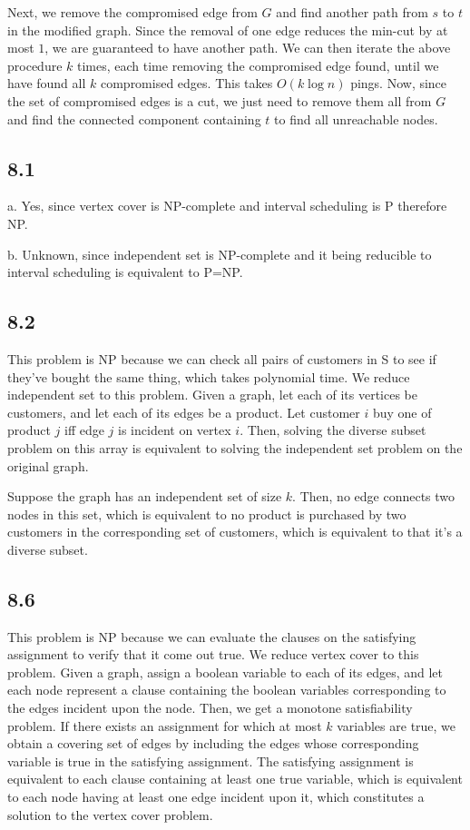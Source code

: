 \documentclass{article}
\begin{document}
Next, we remove the compromised edge from $G$ and find another path from $s$ to $t$ in the modified graph. Since the removal of one edge reduces the min-cut by at most $1$, we are guaranteed to have another path. We can then iterate the above procedure $k$ times, each time removing the compromised edge found, until we have found all $k$ compromised edges. This takes $O(k\log n)$ pings. Now, since the set of compromised edges is a cut, we just need to remove them all from $G$ and find the connected component containing $t$ to find all unreachable nodes.
\subsection*{8.1}
a. Yes, since vertex cover is NP-complete and interval scheduling is P therefore NP.

\noindent b. Unknown, since independent set is NP-complete and it being reducible to interval scheduling is equivalent to P=NP.
\subsection*{8.2}
This problem is NP because we can check all pairs of customers in S to see if they've bought the same thing, which takes polynomial time. We reduce independent set to this problem. Given a graph, let each of its vertices be customers, and let each of its edges be a product. Let customer $i$ buy one of product $j$ iff edge $j$ is incident on vertex $i$. Then, solving the diverse subset problem on this array is equivalent to solving the independent set problem on the original graph.

Suppose the graph has an independent set of size $k$. Then, no edge connects two nodes in this set, which is equivalent to no product is purchased by two customers in the corresponding set of customers, which is equivalent to that it's a diverse subset. 
\subsection*{8.6}
This problem is NP because we can evaluate the clauses on the satisfying assignment to verify that it come out true. We reduce vertex cover to this problem. Given a graph, assign a boolean variable to each of its edges, and let each node represent a clause containing the boolean variables corresponding to the edges incident upon the node. Then, we get a monotone satisfiability problem. If there exists an assignment for which at most $k$ variables are true, we obtain a covering set of edges by including the edges whose corresponding variable is true in the satisfying assignment. The satisfying assignment is equivalent to each clause containing at least one true variable, which is equivalent to each node having at least one edge incident upon it, which constitutes a solution to the vertex cover problem.
\end{document}
